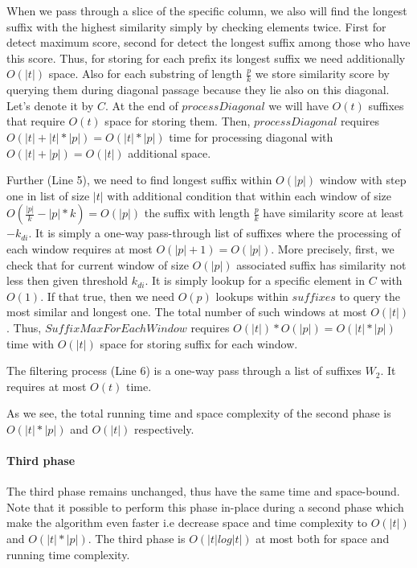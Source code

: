 When we pass through a slice of the specific column, we also will find the longest suffix with the highest similarity simply by checking elements twice.
First for detect maximum score, second for detect the longest suffix among those who have this score.
Thus, for storing for each prefix its longest suffix we need additionally $O(|t|)$ space.
Also for each substring of length $\frac{p}{k}$ we store similarity score by querying them during diagonal passage because they lie also on this diagonal.
Let's denote it by $C$. 
At the end of  $processDiagonal$ we will have $O(t)$ suffixes that require $O(t)$  space for storing them.
Then, $processDiagonal$ requires $O(|t|+|t|*|p|)=O(|t|*|p|)$ time for processing diagonal with $O(|t|+|p|)=O(|t|)$ additional space.
 
Further (Line 5), we need to find longest suffix within $O(|p|)$ window with step one in list of size $|t|$ with additional condition that within each window of size $O(\frac{|p|}{k}-|p|*k)=O(|p|)$ the suffix with length $\frac{p}{k}$ have similarity score at least $-k_{di}$.
It is simply a one-way pass-through list of suffixes where the processing of each window requires at most $O(|p|+1)=O(|p|)$.
More precisely, first, we check that for current window of size $O(|p|)$
associated suffix has similarity not less then given threshold $k_{di}$.
It is simply lookup for a specific element in $C$ with $O(1)$.
If that true, then we need $O(p)$ lookups within $suffixes$ to query the most similar and longest one.    
The total number of such windows at most $O(|t|)$.
Thus, $SuffixMaxForEachWindow$ requires $O(|t|)*O(|p|)=O(|t|*|p|)$ time with $O(|t|)$ space for storing suffix for each window. 

The filtering process (Line 6) is a one-way pass through a list of suffixes $W_2$.
It requires at most $O(t)$ time.

As we see, the total running time and space complexity of the second phase is $O(|t|*|p|)$ and $O(|t|)$ respectively.

\paragraph{Third phase}
The third phase remains unchanged, thus have the same time and space-bound.
Note that it possible to perform this phase in-place during a second phase which 
make the algorithm even faster i.e decrease space and time complexity to $O(|t|)$  and $O(|t|*|p|)$.
The third phase is $O(|t| log|t|)$  at most both for space and running time complexity.

